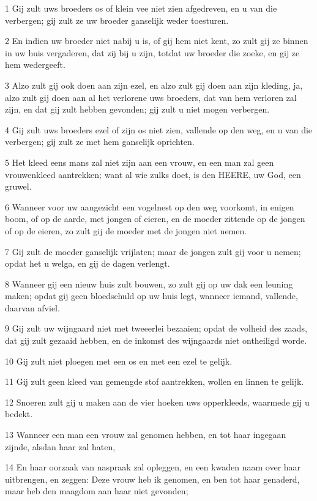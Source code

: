 \par 1 Gij zult uws broeders os of klein vee niet zien afgedreven, en u van die verbergen; gij zult ze uw broeder ganselijk weder toesturen.
\par 2 En indien uw broeder niet nabij u is, of gij hem niet kent, zo zult gij ze binnen in uw huis vergaderen, dat zij bij u zijn, totdat uw broeder die zoeke, en gij ze hem wedergeeft.
\par 3 Alzo zult gij ook doen aan zijn ezel, en alzo zult gij doen aan zijn kleding, ja, alzo zult gij doen aan al het verlorene uws broeders, dat van hem verloren zal zijn, en dat gij zult hebben gevonden; gij zult u niet mogen verbergen.
\par 4 Gij zult uws broeders ezel of zijn os niet zien, vallende op den weg, en u van die verbergen; gij zult ze met hem ganselijk oprichten.
\par 5 Het kleed eens mans zal niet zijn aan een vrouw, en een man zal geen vrouwenkleed aantrekken; want al wie zulks doet, is den HEERE, uw God, een gruwel.
\par 6 Wanneer voor uw aangezicht een vogelnest op den weg voorkomt, in enigen boom, of op de aarde, met jongen of eieren, en de moeder zittende op de jongen of op de eieren, zo zult gij de moeder met de jongen niet nemen.
\par 7 Gij zult de moeder ganselijk vrijlaten; maar de jongen zult gij voor u nemen; opdat het u welga, en gij de dagen verlengt.
\par 8 Wanneer gij een nieuw huis zult bouwen, zo zult gij op uw dak een leuning maken; opdat gij geen bloedschuld op uw huis legt, wanneer iemand, vallende, daarvan afviel.
\par 9 Gij zult uw wijngaard niet met tweeerlei bezaaien; opdat de volheid des zaads, dat gij zult gezaaid hebben, en de inkomst des wijngaards niet ontheiligd worde.
\par 10 Gij zult niet ploegen met een os en met een ezel te gelijk.
\par 11 Gij zult geen kleed van gemengde stof aantrekken, wollen en linnen te gelijk.
\par 12 Snoeren zult gij u maken aan de vier hoeken uws opperkleeds, waarmede gij u bedekt.
\par 13 Wanneer een man een vrouw zal genomen hebben, en tot haar ingegaan zijnde, alsdan haar zal haten,
\par 14 En haar oorzaak van naspraak zal opleggen, en een kwaden naam over haar uitbrengen, en zeggen: Deze vrouw heb ik genomen, en ben tot haar genaderd, maar heb den maagdom aan haar niet gevonden;
